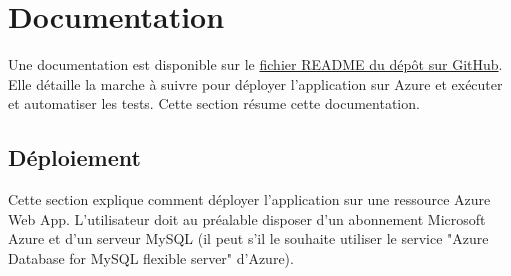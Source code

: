 \documentclass[french]{article}
\begin{document}
    \section{Documentation}

    Une documentation est disponible sur le \href{https://github.com/vinpap/adrenaline.ai/blob/main/README.md}{fichier README du dépôt sur GitHub}. Elle détaille la marche à suivre pour déployer l'application sur Azure et exécuter et automatiser les tests. Cette section résume cette documentation. 

    \subsection{Déploiement}

    Cette section explique comment déployer l'application sur une ressource Azure Web App. L'utilisateur doit au préalable disposer d'un abonnement Microsoft Azure et d'un serveur MySQL (il peut s'il le souhaite utiliser le service "Azure Database for MySQL flexible server" d'Azure).
\end{document}
